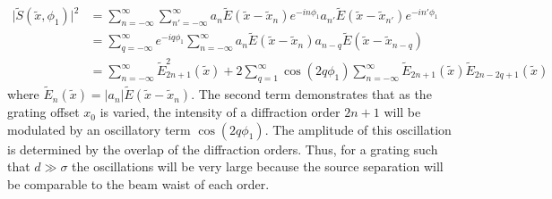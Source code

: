 \begin{equation}
\label{eqn:intensity_modulation}
	\begin{aligned}
	\rvert\tilde{S}(\tilde{x},\phi_1)\rvert^2 &= \sum_{n=-\infty}^{\infty}\sum_{n'=-\infty}^{\infty} a_n \tilde{E}(\tilde{x} - \tilde{x}_n)e^{-in\phi_1}a_{n'} \tilde{E}(\tilde{x} - \tilde{x}_{n'})e^{-in'\phi_1}\\
	&= \sum_{q=-\infty}^{\infty}e^{-iq\phi_1}\sum_{n=-\infty}^{\infty} a_n\tilde{E}(\tilde{x}-\tilde{x}_n) a_{n-q}\tilde{E}(\tilde{x}-\tilde{x}_{n-q})\\
	&= \sum_{n=-\infty}^{\infty}\tilde{E}_{2n+1}^2(\tilde{x}) + 2\sum_{q=1}^{\infty}\cos(2q\phi_1) \sum_{n=-\infty}^{\infty}\tilde{E}_{2n+1}(\tilde{x})\tilde{E}_{2n-2q+1}(\tilde{x})
	\end{aligned}
\end{equation}
where $\tilde{E}_n(\tilde{x})=\rvert a_n\rvert\tilde{E}(\tilde{x} - \tilde{x}_n)$. The second term demonstrates that as the grating offset $x_0$ is varied, the intensity of a diffraction order $2n+1$ will be modulated by an oscillatory term $\cos(2q\phi_1)$.  The amplitude of this oscillation is determined by the overlap of the diffraction orders.  Thus, for a grating such that $d\gg\sigma$ the oscillations will be very large because the source separation will be comparable to the beam waist of each order.

